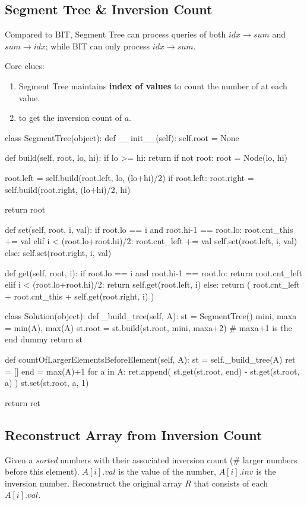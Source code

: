 \subsection{Segment Tree \& Inversion Count}\label{segmentTreeInversionCount}
Compared to BIT, Segment Tree can process queries of both $idx \rightarrow sum$ and $sum \rightarrow idx$; while BIT can only process $idx \rightarrow sum$.

Core clues:
\begin{enumerate}
\item Segment Tree maintains \textbf{index of values} to count the number of at each value.
\item {} to get the inversion count of $a$.
\end{enumerate}
\begin{python}
class SegmentTree(object):
  def __init__(self):
    self.root = None

  def build(self, root, lo, hi):
    if lo >= hi: return
    if not root: root = Node(lo, hi)

    root.left = self.build(root.left, lo, (lo+hi)/2)
    if root.left: 
      root.right = self.build(root.right, (lo+hi)/2, hi)

    return root

  def set(self, root, i, val):
    if root.lo == i and root.hi-1 == root.lo:
      root.cnt_this += val
    elif i < (root.lo+root.hi)/2:
      root.cnt_left += val
      self.set(root.left, i, val)
    else:
      self.set(root.right, i, val)

  def get(self, root, i):
    if root.lo == i and root.hi-1 == root.lo:
      return root.cnt_left
    elif i < (root.lo+root.hi)/2:
      return self.get(root.left, i)
    else:
      return (
          root.cnt_left + root.cnt_this +
          self.get(root.right, i)
      )


class Solution(object):
  def _build_tree(self, A):
    st = SegmentTree()
    mini, maxa = min(A), max(A)
    st.root = st.build(st.root, mini, maxa+2)  
    # maxa+1 is the end dummy
    return st

  def countOfLargerElementsBeforeElement(self, A):
    st = self._build_tree(A)
    ret = []
    end = max(A)+1
    for a in A:
      ret.append(
          st.get(st.root, end) - st.get(st.root, a)
      )
      st.set(st.root, a, 1)

    return ret
\end{python}

\subsection{Reconstruct Array from Inversion Count}\label{inversionReconstruct}
Given a \textit{sorted} numbers with their associated inversion count (\# larger numbers before this element). $A[i].val$ is the value of the number, $A[i].inv$ is the inversion number. Reconstruct the original array $R$ that consists of each $A[i].val$.

